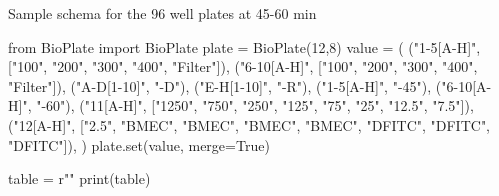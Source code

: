 \begin{enumerate}
\begin{table}[h]
\caption{Sample schema for the 96 well plates at 45-60 min}
\begin{pycode}

from BioPlate import BioPlate
plate = BioPlate(12,8)
value = (
    ("1-5[A-H]", ["100", "200", "300", "400", "Filter"]),
    ("6-10[A-H]", ["100", "200", "300", "400", "Filter"]),
    ("A-D[1-10]", "-D"),
    ("E-H[1-10]", "-R"),
    ("1-5[A-H]", "-45"),
    ("6-10[A-H]", "-60"),
    ("11[A-H]", ["1250", "750", "250", "125", "75", "25", "12.5", "7.5"]),
    ("12[A-H]", ["2.5", "BMEC", "BMEC", "BMEC", "BMEC", "DFITC", "DFITC", "DFITC"]),
)
plate.set(value, merge=True)

table = r""
print(table)
\end{pycode}
\label{table-prelevement-45-60}
\end{table}

\end{enumerate}
